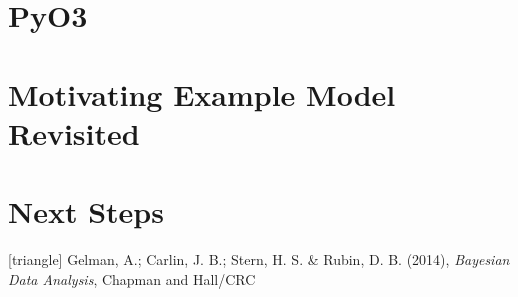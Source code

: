 \documentclass[8pt]{beamer}
\begin{document}
\section{PyO3}

\section{Motivating Example Model Revisited}

\section{Next Steps}
%

\begin{frame}[allowframebreaks]
\begin{thebibliography}{9}
	[triangle]
	Gelman, A.; Carlin, J. B.; Stern, H. S. \& Rubin, D. B. (2014), \emph{Bayesian Data Analysis}, Chapman and Hall/CRC 
\end{thebibliography}
\end{frame}
\end{document}
